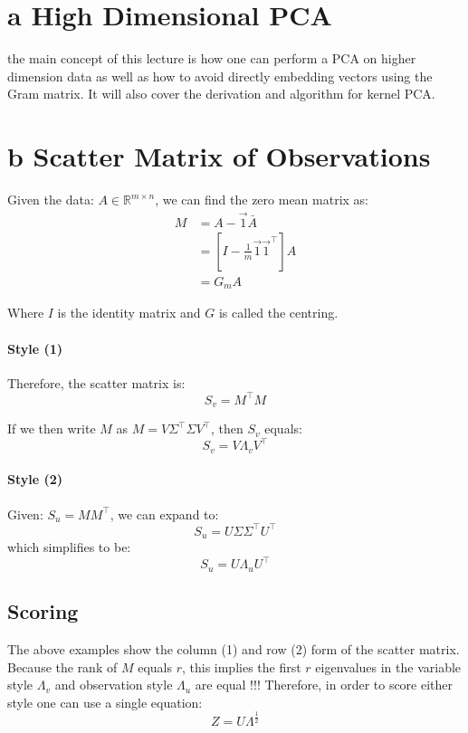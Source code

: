 \documentclass[12pt]{book}
\title{\coursetitle\linebreak\lecturename}
\author{\\Cain Susko\\ 
           \\ \\ \\
      Queen's University 
    \\School of Computing\\}
\begin{document}
\begin{titlepage}
        \maketitle
\end{titlepage}


\section*{a High Dimensional PCA}
the main concept of this lecture is how one can perform a PCA on higher
dimension data as well as how to avoid directly embedding 
vectors using the Gram matrix. It will also cover the derivation and 
algorithm for kernel PCA. 

\section*{b Scatter Matrix of Observations}
Given the data: $A \in \mathbb{R}^{m \times n}$, we can find the 
zero mean matrix as:
\begin{align*}
        M &= A - \vec 1\bar A\\
          &= [I-\frac{1}{m}\vec 1 \vec 1^\top]A\\
          &= G_mA
\end{align*}

Where $I$ is the identity matrix and $G$ is called the centring.
\paragraph{Style (1)}
Therefore, the scatter matrix is:
\[S_v = M^\top M\]

If we then write $M$ as $M = V\Sigma^\top\Sigma V^\top$, then $S_v$ equals:
\[S_v = V\Lambda_v V^\top\]

\paragraph{Style (2)}
Given: $S_u = MM^\top$, we can expand to:
\[S_u = U\Sigma\Sigma^\top U^\top\]
which simplifies to be:
\[S_u = U\Lambda_u U^\top\]

\subsection*{Scoring}
The above examples show the column (1) and row (2) form of the scatter
matrix. Because the rank of $M$ equals $r$, this implies the
first $r$ eigenvalues in the variable style $\Lambda_v$ and observation 
style $\Lambda_u$ are equal !!! Therefore, in order to score either 
style one can use a single equation:
\[Z = U\Lambda^{\frac{1}{2}}\]
\end{document}
